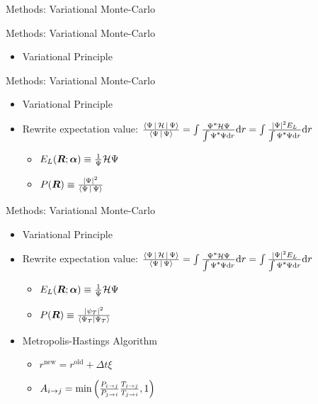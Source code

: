 \documentclass[10pt, t, xcolor=dvipsnames]{beamer}
\begin{document}
\begin{frame}[fragile]{Methods: Variational Monte-Carlo}
\end{frame}

\begin{frame}[fragile]{Methods: Variational Monte-Carlo}
    \begin{itemize}
        \item Variational Principle
    \end{itemize}
\end{frame}

\begin{frame}[fragile]{Methods: Variational Monte-Carlo}
    \begin{itemize}
        \item Variational Principle
        \item Rewrite expectation value:
            $\frac{\Braket{\Psi|\mathcal{H}|\Psi}}{\Braket{\Psi|\Psi}} = \int
            \frac{\cnj{\Psi}\mathcal{H}\Psi}{\int \cnj{\Psi}\Psi \md r} \md r
            = \int \frac{\abs{\Psi}^2E_L}{\int \cnj{\Psi}\Psi \md r} \md r$
            \begin{itemize}
                \item $E_L(\bm{{R}};\bm{{\alpha}}) \equiv \frac{1}{\Psi}\mathcal{H}\Psi$
                \item $P(\bm{{R}}) \equiv \frac{\abs{\Psi}^2}{\Braket{\Psi|\Psi}}$
            \end{itemize}
    \end{itemize}
\end{frame}

\begin{frame}[fragile]{Methods: Variational Monte-Carlo}
    \begin{itemize}
        \item Variational Principle
        \item Rewrite expectation value:
            $\frac{\Braket{\Psi|\mathcal{H}|\Psi}}{\Braket{\Psi|\Psi}} = \int
            \frac{\cnj{\Psi}\mathcal{H}\Psi}{\int \cnj{\Psi}\Psi \md r} \md r
            = \int \frac{\abs{\Psi}^2E_L}{\int \cnj{\Psi}\Psi \md r} \md r$
            \begin{itemize}
                \item $E_L(\bm{{R}};\bm{{\alpha}}) \equiv \frac{1}{\Psi}\mathcal{H}\Psi$
                \item $P(\bm{{R}}) \equiv \frac{\abs{\psi_T}^2}{\bra{\Psi_T}\ket{\Psi_T}}$
            \end{itemize}
        \item Metropolis-Hastings Algorithm
            \begin{itemize}
                \item $r^{\text{new}} = r^{\text{old}} + \Delta t \xi$
                \item $A_{i\rightarrow j} =
                    \text{min}\left(\frac{P_{i\rightarrow j}}{P_{j\rightarrow i}}
                    \frac{T_{i\rightarrow j}}{T_{j\rightarrow i}} ,1\right)$
            \end{itemize}
    \end{itemize}
\end{frame}
\end{document}

